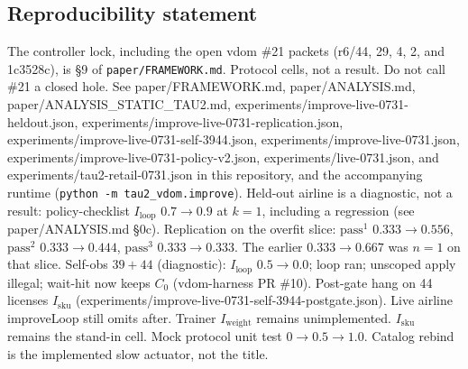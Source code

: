 \documentclass{article}
\begin{document}
\subsection*{Reproducibility statement}
The controller lock, including the open vdom \#21 packets (r6/44, 29, 4, 2, and 1c3528c), is \S9 of \texttt{paper/FRAMEWORK.md}. Protocol cells, not a result. Do not call \#21 a closed hole. See paper/FRAMEWORK.md, paper/ANALYSIS.md, paper/ANALYSIS\_STATIC\_TAU2.md, experiments/improve-live-0731-heldout.json, experiments/improve-live-0731-replication.json, experiments/improve-live-0731-self-3944.json, experiments/improve-live-0731.json, experiments/improve-live-0731-policy-v2.json, experiments/live-0731.json, and experiments/tau2-retail-0731.json in this repository, and the accompanying runtime \citep{vdomharness} (\texttt{python -m tau2\_vdom.improve}). Held-out airline is a diagnostic, not a result: policy-checklist \(I_{\mathrm{loop}}\) \(0.7\to 0.9\) at \(k=1\), including a regression (see paper/ANALYSIS.md §0c). Replication on the overfit slice: \(\mathrm{pass}^1\) \(0.333\to 0.556\), \(\mathrm{pass}^2\) \(0.333\to 0.444\), \(\mathrm{pass}^3\) \(0.333\to 0.333\). The earlier \(0.333\to 0.667\) was \(n=1\) on that slice. Self-obs \(39+44\) (diagnostic): \(I_{\mathrm{loop}}\) \(0.5\to 0.0\); loop ran; unscoped apply illegal; wait-hit now keeps \(C_0\) (vdom-harness PR \#10). Post-gate hang on 44 licenses \(I_{\mathrm{sku}}\) (experiments/improve-live-0731-self-3944-postgate.json). Live airline improveLoop still omits after. Trainer \(I_{\mathrm{weight}}\) remains unimplemented. \(I_{\mathrm{sku}}\) remains the stand-in cell. Mock protocol unit test \(0\to 0.5\to 1.0\). Catalog rebind is the implemented slow actuator, not the title.


\end{document}
